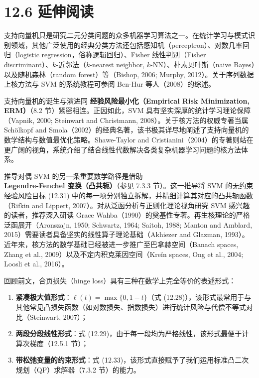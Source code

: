 \section*{12.6 延伸阅读}
\label{sec:12.6}

支持向量机只是研究二元分类问题的众多机器学习算法之一。在统计学习与模式识别领域，其他广泛使用的经典分类方法还包括感知机（perceptron）、对数几率回归（logistic regression，俗称逻辑回归）、Fisher 线性判别（Fisher discriminant）、$ k $-近邻法（$ k $-nearest neighbor, $ k $-NN）、朴素贝叶斯（naive Bayes）以及随机森林（random forest）等（Bishop, 2006; Murphy, 2012）。关于序列数据上核方法与 SVM 的系统教程可参阅 Ben-Hur 等人（2008）的综述。

支持向量机的诞生与演进同 \textbf{经验风险最小化（Empirical Risk Minimization, ERM）}（8.2 节）紧密相连。正因如此，SVM 具有坚实深厚的统计学习理论保障（Vapnik, 2000; Steinwart and Christmann, 2008）。关于核方法的权威专著当属 Schölkopf and Smola（2002）的经典名著，该书极其详尽地阐述了支持向量机的数学结构与数值最优化策略。Shawe-Taylor and Cristianini（2004）的专著则站在更广阔的视角，系统介绍了结合线性代数解决各类复杂机器学习问题的核方法体系。

推导对偶 SVM 的另一条重要数学路径是借助 \textbf{Legendre-Fenchel 变换（凸共轭）}（参见 7.3.3 节）。这一推导将 SVM 的无约束经验风险目标 (12.31) 中的每一项分别独立拆解，并精细计算其对应的凸共轭函数（Rifkin and Lippert, 2007）。对从泛函分析与正则化理论视角研究 SVM 感兴趣的读者，推荐深入研读 Grace Wahba（1990）的奠基性专著。再生核理论的严格泛函展开（Aronszajn, 1950; Schwartz, 1964; Saitoh, 1988; Manton and Amblard, 2015）需要读者具备坚实的线性算子理论基础（Akhiezer and Glazman, 1993）。近年来，核方法的数学基础已经被进一步推广至巴拿赫空间（Banach spaces, Zhang et al., 2009）以及不定内积克莱因空间（Kreĭn spaces, Ong et al., 2004; Loosli et al., 2016）。

回顾前文，合页损失（hinge loss）具有三种在数学上完全等价的表述形式：

\begin{enumerate}
\item \textbf{紧凑极大值形式}：$ \ell(t) = \max\{0, 1 - t\} $（式 (12.28)），该形式最常用于与其他常见凸损失函数（如对数损失、指数损失）进行统计风险与代偿不等式对比（Steinwart, 2007）；
\item \textbf{两段分段线性形式}：式 (12.29)，由于每一段均为严格线性，该形式最便于计算次梯度（12.5.1 节）；
\item \textbf{带松弛变量的约束形式}：式 (12.33)，该形式直接赋予了我们运用标准凸二次规划（QP）求解器（7.3.2 节）的能力。
\end{enumerate}

